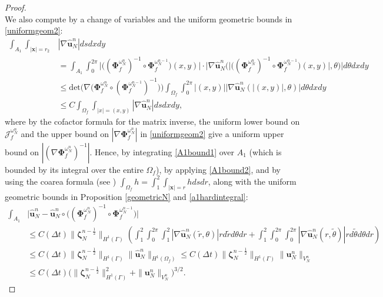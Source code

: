 \documentclass[11pt]{article}
\newcommand{\bd}{\boldsymbol}
\theoremstyle{definition}
\begin{document}
\begin{proof}
\begin{equation}
\end{equation}
We also compute by a change of variables and the uniform geometric bounds in \eqref{uniformgeom2}:
\begin{align}\label{a1hardintegral}
\int_{A_{1}} \int_{|\bd{x}| = r_{2}} &|\nabla \hat{\bd{u}}^{n}_{N}| ds dx dy \nonumber \\
&= \int_{A_{1}} \int_{0}^{2\pi} \Big|\Big((\bd{\Phi}^{\omega^{n}_{N}}_{f})^{-1} \circ \bd{\Phi}^{\omega^{n - 1}_{N}}_{f}\Big)(x, y)\Big| \cdot \Bigg| \nabla \hat{\bd{u}}^{n}_{N}\Big(\Big|\Big((\bd{\Phi}^{\omega^{n}_{N}}_{f})^{-1} \circ \bd{\Phi}^{\omega^{n - 1}_{N}}_{f}\Big)(x, y)\Big|, \theta\Big)\Bigg| d\theta dx dy \nonumber\\
&\le \text{det}\Big(\nabla \Big(\bd{\Phi}^{\omega^{n}_{N}}_{f} \circ (\bd{\Phi}^{\omega^{n - 1}_{N}}_{f})^{-1}\Big)\Big) \int_{\Omega_{f}} \int_{0}^{2\pi} |(x, y)| \Big|\nabla \hat{\bd{u}}^{n}_{N}(|(x, y)|, \theta)\Big| d\theta dx dy \nonumber \\
&\le C \int_{\Omega_{f}} \int_{|x| = (x, y)} |\nabla \hat{\bd{u}}^{n}_{N}| ds dx dy,
\end{align}
where by the cofactor formula for the matrix inverse, the uniform lower bound on $\mathcal{J}^{\omega^{n}_{N}}_{f}$ and the upper bound on $|\nabla \bd{\Phi}^{\omega^{n}_{N}}_{f}|$ in \eqref{uniformgeom2} give a uniform upper bound on $|(\nabla \bd{\Phi}^{\omega^{n}_{N}}_{f})^{-1}|$. Hence, by integrating \eqref{A1bound1} over $A_{1}$ (which is bounded by its integral over the entire $\Omega_{f}$), by applying \eqref{A1bound2}, and by using the coarea formula (see \cite{Evans}) $\displaystyle \int_{\Omega_{f}} h = \int_{1}^{2} \int_{|\bd{x}| = r} h ds dr$, along with the uniform geometric bounds in Proposition \ref{geometricN} and \eqref{a1hardintegral}:
\begin{align}\label{unNtilde1}
\int_{A_{1}} &\Big|\hat{\bd{u}}^{n}_{N} - \hat{\bd{u}}^{n}_{N} \circ \Big((\bd{\Phi}^{\omega^{n}_{N}}_{f})^{-1} \circ \bd{\Phi}^{\omega^{n - 1}_{N}}_{f}\Big)\Big| \nonumber \\
&\le C(\Delta t) \|\bd{\zeta}^{n - \frac{1}{2}}_{N}\|_{H^{1}(\Gamma)} \left(\int_{1}^{2} \int_{0}^{2\pi} \int_{1}^{2} |\nabla \hat{\bd{u}}^{n}_{N}(\tilde{r}, \theta)| r d\tilde{r} d\theta dr + \int_{1}^{2} \int_{0}^{2\pi} \int_{0}^{2\pi} |\nabla \hat{\bd{u}}^{n}_{N}(r, \tilde{\theta})| rd\tilde{\theta} d\theta dr\right) \nonumber \\
&\le C(\Delta t) \|\bd{\zeta}^{n - \frac{1}{2}}_{N}\|_{H^{1}(\Gamma)} \|\hat{\bd{u}}^{n}_{N}\|_{H^{1}(\Omega_{f})} \le C(\Delta t) \|\bd{\zeta}^{n - \frac{1}{2}}_{N}\|_{H^{1}(\Gamma)} \|\bd{u}^{n}_{N}\|_{V^{n}_{N}} \nonumber \\
&\le C(\Delta t) \Big(\|\bd{\zeta}^{n - \frac{1}{2}}_{N}\|_{H^{1}(\Gamma)}^{2} + \|\bd{u}^{n}_{N}\|_{V^{n}_{N}}\Big)^{3/2}.
\end{align}


\end{proof}
\end{document}
